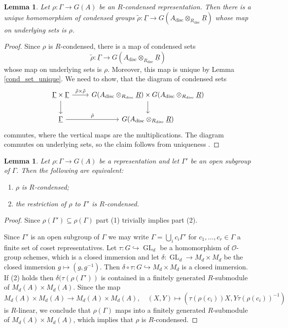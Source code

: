 \documentclass{amsart}
\newtheorem{lem}[prop]{Lemma}
\theoremstyle{definition}
\theoremstyle{remark}
\DeclareMathOperator{\GL}{GL}
\newcommand{\OO}{\mathcal O}
\newcommand{\disc}{\operatorname{disc}} %
\begin{document}
\begin{lem}
    Let $\rho : \Gamma \to G(A)$ be an $R$-condensed representation.
    Then there is a unique homomorphism of condensed groups $\tilde \rho : \underline{\Gamma} \to G(A_{\disc} \otimes_{R_{\disc}} \underline{R})$ whose map on underlying sets is $\rho$.
\end{lem}

\begin{proof}
    Since $\rho$ is $R$-condensed, there is a map of condensed sets $$\tilde \rho : \underline{\Gamma} \to G(A_{\disc} \otimes_{R_{\disc}} \underline{R})$$ whose map on underlying sets is $\rho$. 
    Moreover, this map is unique by Lemma \ref{cond_set_unique}. We need to show, that the diagram of condensed sets
    \begin{equation}
    \begin{tikzcd}
        \underline \Gamma \times \underline \Gamma \arrow[d] \arrow[r, "\tilde \rho \times \tilde \rho"] & G(A_{\disc} \otimes_{R_{\disc}} \underline{R}) \times G(A_{\disc} \otimes_{R_{\disc}} \underline{R}) \arrow[d] \\
        \underline \Gamma \arrow[r, "\tilde\rho"] & G(A_{\disc} \otimes_{R_{\disc}} \underline{R})
    \end{tikzcd}
    \end{equation}
    commutes, where the vertical maps are the multiplications.
    The diagram commutes on underlying sets, so the claim follows from uniqueness . 
\end{proof}

\begin{lem}\label{rest_open} Let $\rho: \Gamma \rightarrow G(A)$ be a representation and 
let $\Gamma'$ be an open subgroup of $\Gamma$. Then the following are equivalent:
\begin{enumerate}
\item $\rho$ is $R$-condensed;
\item the restriction of $\rho$ to $\Gamma'$ is $R$-condensed.
\end{enumerate}
\end{lem}
\begin{proof} Since $\rho(\Gamma')\subseteq \rho(\Gamma)$ part (1) trivially implies 
part (2). 

Since $\Gamma'$ is an open subgroup of $\Gamma$  we may write $\Gamma = \bigcup_i c_i \Gamma'$ for $c_1, \dots, c_r \in \Gamma$ a finite set of coset representatives. Let $\tau : G \hookrightarrow \GL_d$ be a homomorphism of $\OO$-group schemes, which is a closed immersion
    and let $\delta: \GL_d\rightarrow M_d\times M_d$ be the closed immersion $g\mapsto (g, g^{-1})$. 
    Then $\delta\circ \tau : G \hookrightarrow M_d \times M_d$ is a closed immersion. 
    If (2) holds then $\delta(\tau(\rho(\Gamma'))$ is contained in a finitely generated 
    $R$-submodule of $M_d(A)\times M_d(A)$. 
    Since the map 
    $$M_d(A)\times M_d(A)\rightarrow M_d(A)\times M_d(A), \quad (X, Y)\mapsto (\tau(\rho(c_i))X, Y\tau(\rho(c_i))^{-1})$$ 
    is $R$-linear, we conclude that $\rho(\Gamma)$ maps into a finitely generated $R$-submodule of $M_d(A) \times M_d(A)$, which implies that $\rho$ is $R$-condensed.
    \end{proof}
    
\end{document}

